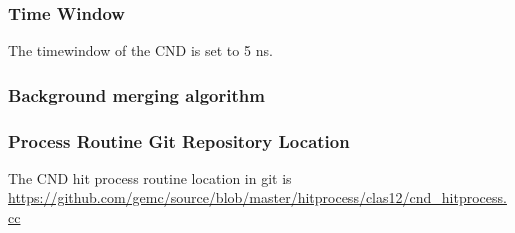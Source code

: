 \subsubsection{Time Window}
The timewindow of the CND is set to 5 ns.


\subsubsection{Background merging algorithm}

\subsubsection{Process Routine Git Repository Location}
The CND hit process routine location in git is \url{https://github.com/gemc/source/blob/master/hitprocess/clas12/cnd_hitprocess.cc}
